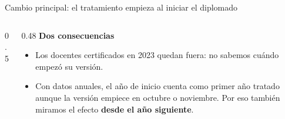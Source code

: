 \documentclass[10pt,aspectratio=169]{beamer}
\begin{document}
\begin{frame}{Cambio principal: el tratamiento empieza al iniciar el diplomado}
\begin{columns}[T]
\begin{column}{0.5\textwidth}
    \end{column}
    \begin{column}{0.48\textwidth}\small
      \textbf{Dos consecuencias}
      \begin{itemize}
        \item Los docentes certificados en 2023 \alert{quedan fuera}: no sabemos cuándo empezó su versión.
        \item Con datos anuales, el año de inicio cuenta como primer año tratado aunque la versión empiece en octubre o noviembre. Por eso también miramos el efecto \textbf{desde el año siguiente}.
      \end{itemize}
    \end{column}
  \end{columns}
\end{frame}
\end{document}
